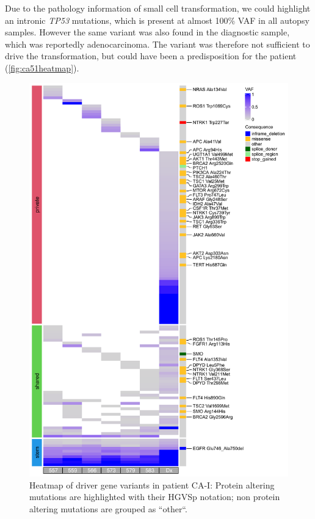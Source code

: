 Due to the pathology information of small cell transformation, we could highlight an intronic \textit{TP53} mutations, which is present at almost 100\% VAF in all autopsy samples. However the same variant was also found in the diagnostic sample, which was reportedly adenocarcinoma. The variant was therefore not sufficient to drive the transformation, but could have been a predisposition for the patient (\autoref{fig:ca51heatmap}).


\begin{figure}[ht]
\centering
\includegraphics[width=.99\linewidth]{Figures/CASCADE/CA51/CA51varHeatmap.pdf}
\caption[Heatmap of driver gene variants in patient CA-I]{Heatmap of driver gene variants in patient CA-I: Protein altering mutations are highlighted with their HGVSp notation; non protein altering mutations are grouped as ``other``.} \label{fig:ca51heatmap}
\end{figure}



